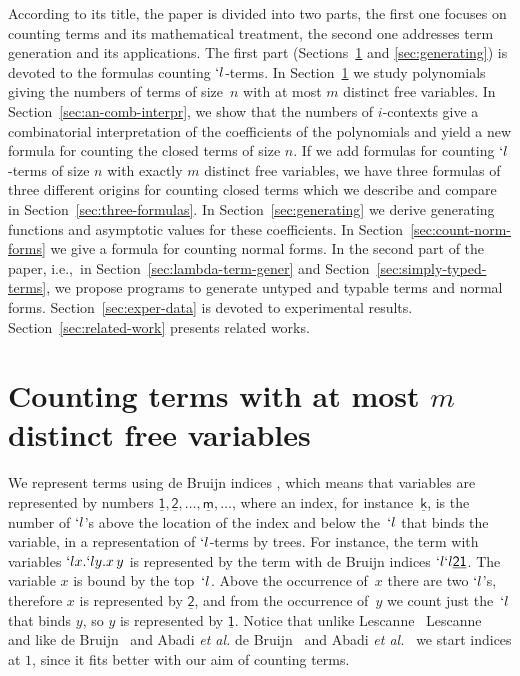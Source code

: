 \documentclass{jfp1}
\newcommand{\ie}{i.e.,~}
\newcommand{\Var}[1]{\underline{\mathsf{#1}}}
\begin{document}
According to its title, the paper is divided into two parts, the first one focuses on counting terms
and its mathematical treatment, the second one addresses term generation and its applications. The
first part (Sections~\ref{sec:polyn-count-lambd} and \ref{sec:generating}) is devoted to
the formulas counting $`l$-terms.  In Section~\ref{sec:polyn-count-lambd} we study
polynomials giving the numbers of terms of size~$n$ with at most $m$ distinct free
variables.  In
Section~\ref{sec:an-comb-interpr}, we show that the numbers of $i$-contexts give a
combinatorial interpretation of the coefficients of the polynomials and yield a new formula
for counting the closed terms of size $n$. If we add formulas for counting $`l$-terms of
size $n$ with exactly $m$ distinct free variables, we have three formulas of three different origins for
counting closed terms which we describe and compare in Section~\ref{sec:three-formulas}.
In Section~\ref{sec:generating} we derive generating functions and asymptotic values for
these coefficients.  In Section~\ref{sec:count-norm-forms} we give a formula for counting
normal forms.  In the second part of the paper, \ie in Section~\ref{sec:lambda-term-gener} and
Section~\ref{sec:simply-typed-terms}, we propose programs to generate untyped and typable
terms and normal forms.  Section~\ref{sec:exper-data} is devoted to experimental
results.  Section~\ref{sec:related-work} presents related works.









\section{Counting terms with at most $m$ distinct free variables}
\label{sec:polyn-count-lambd}


We represent terms using de Bruijn indices \cite{deBruijn72}, which means that
variables are represented by numbers $\Var{1}, \Var{2}, \ldots, \Var{m}, \ldots$,
where an index, for instance~$\Var{k}$, is the number of $`l$'s above the location of
the index and below the~$`l$ that binds the variable, in a representation of
$`l$-terms by trees.  For instance, the term with variables $`l x. `l y. x\,y$ is
represented by the term with de Bruijn indices $`l `l \Var{2} \Var{1}$. The variable
$x$ is bound by the top~$`l$.  Above the occurrence of~$x$ there are two $`l$'s,
therefore $x$ is represented by $\Var{2}$, and from the occurrence of~$y$ we count
just the~$`l$ that binds $y$, so $y$ is represented by $\Var{1}$.  Notice that unlike
\ifJFP Lescanne~ \else Lescanne~\cite{LescannePOPL94} \fi and like
\ifJFP de Bruijn~ and Abadi \emph{et al.}
 \else de Bruijn~\cite{deBruijn72}  and Abadi \emph{et
  al.}~\cite{AbadiCCL91JFP} \fi we start
indices at $1$, since it fits better with our aim of counting terms.
\end{document}

